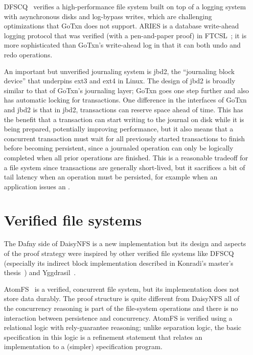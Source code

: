DFSCQ~\cite{chen:dfscq} verifies a high-performance file system built on top of
a logging system with asynchronous disks and log-bypass writes, which are
challenging optimizations that GoTxn does not support. ARIES is a database
write-ahead logging protocol that was verified (with a pen-and-paper proof) in
FTCSL~\cite{ntzik:faults}; it is more sophisticated than GoTxn's write-ahead log
in that it can both undo and redo operations.

An important but unverified journaling system is jbd2, the ``journaling block
device'' that underpins ext3 and ext4 in Linux. The design of jbd2 is broadly
similar to that of GoTxn's journaling layer; GoTxn goes one step further and
also has automatic locking for transactions. One difference in the interfaces of
GoTxn and jbd2 is that in jbd2, transactions can reserve space ahead of time.
This has the benefit that a transaction can start writing to the journal on disk
while it is being prepared, potentially improving performance, but it also means
that a concurrent transaction must wait for all previously started transactions
to finish before becoming persistent, since a journaled operation can only be
logically completed when all prior operations are finished. This is a reasonable
tradeoff for a file system since transactions are generally short-lived, but it
sacrifices a bit of tail latency when an operation must be persisted, for
example when an application issues an .

\section{Verified file systems}
\label{sec:rel:verified-fs}

The Dafny side of DaisyNFS is a new implementation but its design and aspects of
the proof strategy were inspired by other verified file systems like
DFSCQ~\cite{chen:dfscq} (especially its indirect block implementation described
in Konradi's master's thesis~\cite{akonradi-meng}) and
Yggdrasil~\cite{sigurbjarnarson:yggdrasil}.

AtomFS~\cite{zou:atomfs} is a verified, concurrent file system, but its
implementation does not store data durably. The proof structure is quite
different from DaisyNFS all of the concurrency reasoning is part of the
file-system operations and there is no interaction between persistence and
concurrency. AtomFS is verified using a relational logic with rely-guarantee
reasoning; unlike separation logic, the basic specification in this logic is a
refinement statement that relates an implementation to a (simpler) specification
program.

